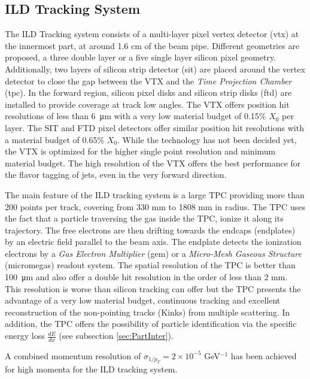 \subsection{ILD Tracking System}

The ILD Tracking system consists of a multi-layer pixel vertex detector (\acrshort{vtx}) at the innermost part, at around 1.6 cm of the beam pipe. Different geometries are proposed, a three double layer or a five single layer silicon pixel geometry. Additionally, two layers of silicon strip detector (\acrshort{sit}) are placed around the vertex detector to close the gap between the VTX and the \textit{Time Projection Chamber} (\acrshort{tpc}). In the forward region, silicon pixel disks and silicon strip disks (\acrshort{ftd}) are installed to provide coverage at track low angles. The VTX offers position hit resolutions of less than \SI{6}{\micro\meter} with a very low material budget of 0.15\% $X_0$ per layer. The SIT and FTD pixel detectors offer similar position hit resolutions with a material budget of 0.65\% $X_0$. While the technology has not been decided yet, the VTX is optimized for the higher single point resolution and minimum material budget. The high resolution of the VTX offers the best performance for the flavor tagging of jets, even in the very forward direction.

The main feature of the ILD tracking system is a large TPC providing more than 200 points per track, covering from 330 mm to 1808 mm in radius. The TPC uses the fact that a particle traversing the gas inside the TPC, ionize it along its trajectory. The free electrons are then drifting towards the endcaps (endplates) by an electric field parallel to the beam axis. The endplate detects the ionization electrons by a \textit{Gas Electron Multiplier} (\acrshort{gem}) or a \textit{Micro-Mesh Gaseous Structure} (\acrshort{micromegas}) readout system. The spatial resolution of the TPC is better than \SI{100}{\micro\meter} and also offer a double hit resolution in the order of less than 2 mm. This resolution is worse than silicon tracking can offer but the TPC presents the advantage of a very low material budget, continuous tracking and excellent reconstruction of the non-pointing tracks (Kinks) from multiple scattering. In addition, the TPC offers the possibility of particle identification via the specific energy loss $\frac{dE}{dx}$ (see subsection \ref{sec:PartInter}).

A combined momentum resolution of $\sigma_{1/p_T} = 2 \times 10^{-5}$ GeV$^{-1}$ has been achieved for high momenta for the ILD tracking system.

